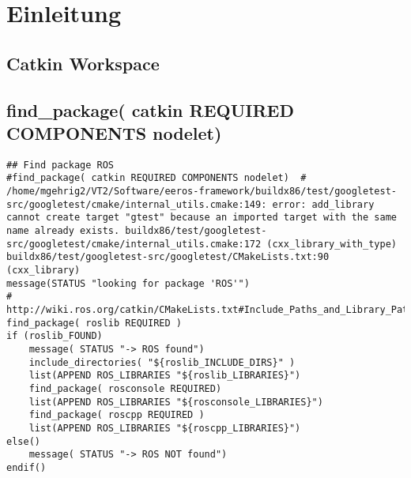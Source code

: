 \chapter{Einleitung}


\section{Catkin Workspace}




\section{find\_package( catkin REQUIRED COMPONENTS nodelet)}
\lstset{language=c}
\begin{lstlisting}
## Find package ROS
#find_package( catkin REQUIRED COMPONENTS nodelet)	# /home/mgehrig2/VT2/Software/eeros-framework/buildx86/test/googletest-src/googletest/cmake/internal_utils.cmake:149: error: add_library cannot create target "gtest" because an imported target with the same name already exists. buildx86/test/googletest-src/googletest/cmake/internal_utils.cmake:172 (cxx_library_with_type) buildx86/test/googletest-src/googletest/CMakeLists.txt:90 (cxx_library)
message(STATUS "looking for package 'ROS'")
# http://wiki.ros.org/catkin/CMakeLists.txt#Include_Paths_and_Library_Paths
find_package( roslib REQUIRED )
if (roslib_FOUND)
	message( STATUS "-> ROS found")
	include_directories( "${roslib_INCLUDE_DIRS}" )
	list(APPEND ROS_LIBRARIES "${roslib_LIBRARIES}")
	find_package( rosconsole REQUIRED)
	list(APPEND ROS_LIBRARIES "${rosconsole_LIBRARIES}")
	find_package( roscpp REQUIRED )
	list(APPEND ROS_LIBRARIES "${roscpp_LIBRARIES}")
else()
	message( STATUS "-> ROS NOT found")
endif()
\end{lstlisting}


